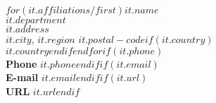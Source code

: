 $for(it.affiliations/first)$\textbf{\color{odublue}$it.name$}\\\textbf{\color{odublue}$it.department$}\\$it.address$\\$it.city$, $it.region$ $it.postal-code$$if(it.country)$\\$it.country$$endif$$endfor$$if(it.phone)$\\\textbf{\color{odublue}Phone} $it.phone$$endif$$if(it.email)$\\\textbf{\color{odublue}E-mail} $it.email$$endif$$if(it.url)$\\\textbf{\color{odublue}URL} $it.url$$endif$